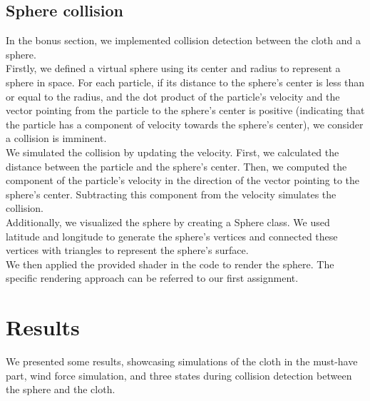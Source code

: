 \documentclass[acmtog]{acmart}
\begin{document}
\subsection{Sphere collision}
In the bonus section, we implemented collision detection between the cloth and a sphere.\\
Firstly, we defined a virtual sphere using its center and radius to represent a sphere in space. For each particle, if its distance to the sphere's center is less than or equal to the radius, and the dot product of the particle's velocity and the vector pointing from the particle to the sphere's center is positive (indicating that the particle has a component of velocity towards the sphere's center), we consider a collision is imminent.\\
We simulated the collision by updating the velocity. First, we calculated the distance between the particle and the sphere's center. Then, we computed the component of the particle's velocity in the direction of the vector pointing to the sphere's center. Subtracting this component from the velocity simulates the collision.\\
Additionally, we visualized the sphere by creating a Sphere class. We used latitude and longitude to generate the sphere's vertices and connected these vertices with triangles to represent the sphere's surface.\\
We then applied the provided shader in the code to render the sphere. The specific rendering approach can be referred to our first assignment.


\section{Results}

We presented some results, showcasing simulations of the cloth in the must-have part, wind force simulation, and three states during collision detection between the sphere and the cloth.
\end{document}
